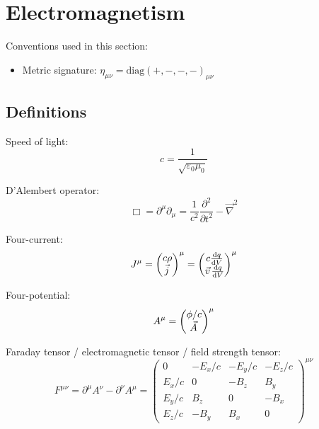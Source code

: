 \section{Electromagnetism}
	Conventions used in this section:
	\begin{itemize}
		\item Metric signature: $\eta_{\mu\nu} = \mathrm{diag}(+,-,-,-)_{\mu\nu}$
	\end{itemize}


	\subsection{Definitions}
		\noindent
		Speed of light:
		\begin{equation}
			c=\frac{1}{\sqrt{\varepsilon_0 \mu_0}}
		\end{equation}

		\noindent
		D'Alembert operator:
		\begin{equation}
			\Box = \partial^\mu \partial_\mu = \frac{1}{c^2}\frac{\partial^2}{\partial t^2} - \vec{\nabla}^2
		\end{equation}

		\noindent
		Four-current:
		\begin{equation}
			J^\mu
			= \mqty(c\rho\\\vec{j})^\mu
			= \mqty(c\dv{q}{V}\\\vec{v}\dv{q}{V})^\mu
		\end{equation}

		\noindent
		Four-potential:
		\begin{equation}
			A^\mu
			= \mqty(\phi/c\\\vec{A})^\mu
		\end{equation}

		\noindent
		Faraday tensor / electromagnetic tensor / field strength tensor:
		\begin{equation}
			F^{\mu\nu} = \partial^\mu A^\nu - \partial^\nu A^\mu
			= \left( \begin{matrix}
				0     & -E_x/c & -E_y/c & -E_z/c \\
				E_x/c & 0      & -B_z   & B_y    \\
				E_y/c & B_z    & 0      & -B_x   \\
				E_z/c & -B_y   & B_x    & 0
			\end{matrix} \right)^{\mu\nu}
		\end{equation}


